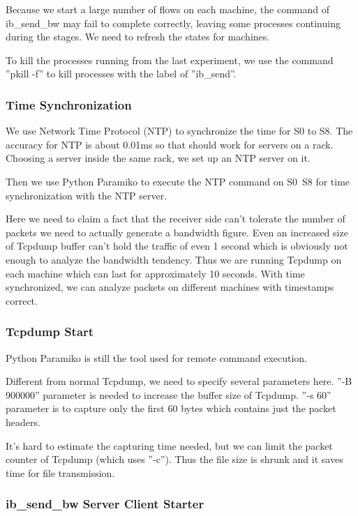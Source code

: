 \documentclass[12pt,a4paper]{article}
\begin{document}
Because we start a large number of flows on each machine, the command of ib\_send\_bw may fail to complete correctly, leaving
some processes continuing during the stages. We need to refresh the states for machines.

To kill the processes running from the last experiment, we use the command ''pkill -f'' to kill processes with the label of ''ib\_send''.

\subsubsection{Time Synchronization}
We use Network Time Protocol (NTP) to synchronize the time for S0 to S8.
The accuracy for NTP is about 0.01ms so that should work for servers on a rack.
Choosing a server inside the same rack, we set up an NTP server on it.

Then we use Python Paramiko to execute the NTP command on S0~S8 for time synchronization with the NTP server.

Here we need to claim a fact that the receiver side can't tolerate the number of packets we need to actually generate a bandwidth figure.
Even an increased size of Tcpdump buffer can't hold the traffic of even 1 second which is obviously not enough to analyze the bandwidth tendency.
Thus we are running Tcpdump on each machine which can last for approximately 10 seconds.
With time synchronized, we can analyze packets on different machines with timestamps correct.

\subsubsection{Tcpdump Start}
Python Paramiko is still the tool used for remote command execution.

Different from normal Tcpdump, we need to specify several parameters here.
''-B 900000'' parameter is needed to increase the buffer size of Tcpdump.
''-s 60'' parameter is to capture only the first 60 bytes which contains just the packet headers.

It's hard to estimate the capturing time needed, but we can limit the packet counter of Tcpdump (which uses ''-c'').
Thus the file size is shrunk and it saves time for file transmission.

\subsubsection{ib\_send\_bw Server Client Starter}
\end{document}
